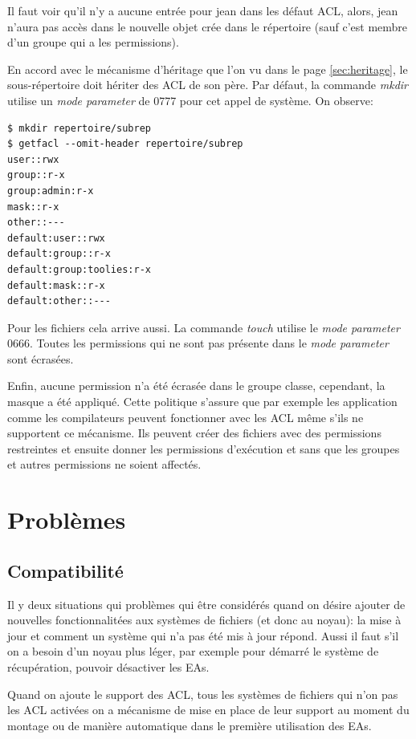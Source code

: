 Il faut voir qu'il n'y a aucune entrée pour jean dans les défaut ACL, alors, jean n'aura pas accès dans le nouvelle objet crée dans le répertoire (sauf c'est membre d'un groupe qui a les permissions). 

En accord avec le mécanisme d'héritage que l'on vu dans le page \ref{sec:heritage}, le sous-répertoire doit hériter des ACL de son père. Par défaut, la commande \emph{mkdir} utilise un \emph{mode parameter} de 0777 pour cet appel de système. On observe:

\begin{verbatim}
$ mkdir repertoire/subrep 
$ getfacl --omit-header repertoire/subrep 
user::rwx 
group::r-x 
group:admin:r-x 
mask::r-x 
other::--- 
default:user::rwx 
default:group::r-x 
default:group:toolies:r-x 
default:mask::r-x 
default:other::---
\end{verbatim}

Pour les fichiers cela arrive aussi. La commande \emph{touch} utilise le \emph{mode parameter} 0666. Toutes les permissions qui ne sont pas présente dans le \emph{mode parameter} sont écrasées.

Enfin, aucune permission n'a été écrasée dans le groupe classe, cependant, la masque a été appliqué. Cette politique s'assure que par exemple les application comme les compilateurs peuvent fonctionner avec les ACL même s'ils ne supportent ce mécanisme. Ils peuvent créer des fichiers avec des permissions restreintes et ensuite donner les permissions d'exécution et sans que les groupes et autres permissions ne soient affectés.


\section*{Problèmes}

\subsection*{Compatibilité}

Il y deux situations qui problèmes qui être considérés quand on désire ajouter de nouvelles fonctionnalitées aux systèmes de fichiers (et donc au noyau): la mise à jour et comment un système qui n'a pas été mis à jour répond.
Aussi il faut s'il on a besoin d'un noyau plus léger, par exemple pour démarré le système de récupération, pouvoir désactiver les EAs. 

Quand on ajoute le support des ACL, tous les systèmes de fichiers qui n'on pas les ACL activées on a mécanisme de mise en place de leur support au moment du montage ou de manière automatique dans le première utilisation des EAs. 

